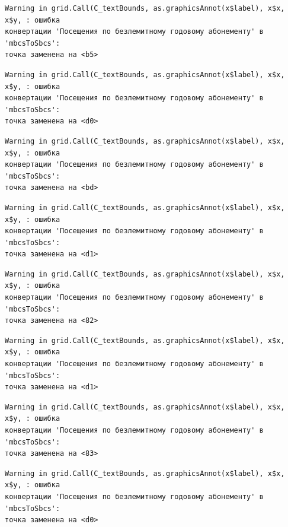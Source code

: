 \documentclass[
  letterpaper,
  DIV=11,
  numbers=noendperiod]{scrreprt}
\begin{document}
\begin{verbatim}
Warning in grid.Call(C_textBounds, as.graphicsAnnot(x$label), x$x, x$y, : ошибка
конвертации 'Посещения по безлемитному годовому абонементу' в 'mbcsToSbcs':
точка заменена на <b5>
\end{verbatim}

\begin{verbatim}
Warning in grid.Call(C_textBounds, as.graphicsAnnot(x$label), x$x, x$y, : ошибка
конвертации 'Посещения по безлемитному годовому абонементу' в 'mbcsToSbcs':
точка заменена на <d0>
\end{verbatim}

\begin{verbatim}
Warning in grid.Call(C_textBounds, as.graphicsAnnot(x$label), x$x, x$y, : ошибка
конвертации 'Посещения по безлемитному годовому абонементу' в 'mbcsToSbcs':
точка заменена на <bd>
\end{verbatim}

\begin{verbatim}
Warning in grid.Call(C_textBounds, as.graphicsAnnot(x$label), x$x, x$y, : ошибка
конвертации 'Посещения по безлемитному годовому абонементу' в 'mbcsToSbcs':
точка заменена на <d1>
\end{verbatim}

\begin{verbatim}
Warning in grid.Call(C_textBounds, as.graphicsAnnot(x$label), x$x, x$y, : ошибка
конвертации 'Посещения по безлемитному годовому абонементу' в 'mbcsToSbcs':
точка заменена на <82>
\end{verbatim}

\begin{verbatim}
Warning in grid.Call(C_textBounds, as.graphicsAnnot(x$label), x$x, x$y, : ошибка
конвертации 'Посещения по безлемитному годовому абонементу' в 'mbcsToSbcs':
точка заменена на <d1>
\end{verbatim}

\begin{verbatim}
Warning in grid.Call(C_textBounds, as.graphicsAnnot(x$label), x$x, x$y, : ошибка
конвертации 'Посещения по безлемитному годовому абонементу' в 'mbcsToSbcs':
точка заменена на <83>
\end{verbatim}

\begin{verbatim}
Warning in grid.Call(C_textBounds, as.graphicsAnnot(x$label), x$x, x$y, : ошибка
конвертации 'Посещения по безлемитному годовому абонементу' в 'mbcsToSbcs':
точка заменена на <d0>
\end{verbatim}
\end{document}

